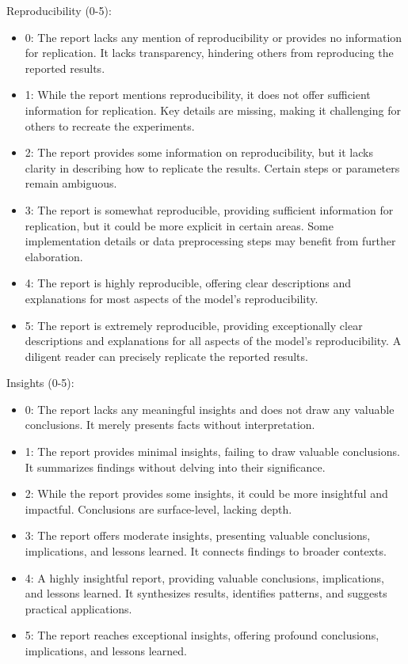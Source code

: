 \documentclass[11pt,a4paper]{storm-ai_report}
\begin{document}
Reproducibility (0-5):
\begin{itemize}
    \item 0: The report lacks any mention of reproducibility or provides no information for replication. It lacks transparency, hindering others from reproducing the reported results.
    \item 1: While the report mentions reproducibility, it does not offer sufficient information for replication. Key details are missing, making it challenging for others to recreate the experiments.
    \item 2: The report provides some information on reproducibility, but it lacks clarity in describing how to replicate the results. Certain steps or parameters remain ambiguous.
    \item 3: The report is somewhat reproducible, providing sufficient information for replication, but it could be more explicit in certain areas. Some implementation details or data preprocessing steps may benefit from further elaboration.
    \item 4: The report is highly reproducible, offering clear descriptions and explanations for most aspects of the model’s reproducibility. 
    \item 5: The report is extremely reproducible, providing exceptionally clear descriptions and explanations for all aspects of the model’s reproducibility. A diligent reader can precisely replicate the reported results.
\end{itemize}

Insights (0-5):
\begin{itemize}
    \item 0: The report lacks any meaningful insights and does not draw any valuable conclusions. It merely presents facts without interpretation.
    \item 1: The report provides minimal insights, failing to draw valuable conclusions. It summarizes findings without delving into their significance.
    \item 2: While the report provides some insights, it could be more insightful and impactful. Conclusions are surface-level, lacking depth.
    \item 3: The report offers moderate insights, presenting valuable conclusions, implications, and lessons learned. It connects findings to broader contexts.
    \item 4: A highly insightful report, providing valuable conclusions, implications, and lessons learned. It synthesizes results, identifies patterns, and suggests practical applications.
    \item 5: The report reaches exceptional insights, offering profound conclusions, implications, and lessons learned.
\end{itemize}
\end{document}
